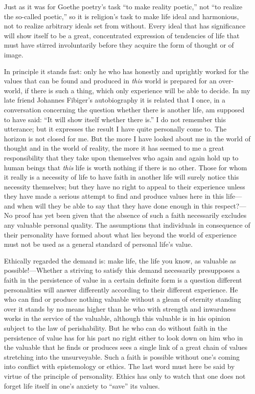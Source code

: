 \documentclass[12pt,a4paper]{book}
\newcommand{\opage}[1]{\marginnote{\footnotesize\textit{[#1]}}}
\begin{document}
Just as it was for Goethe poetry's task ``to make reality poetic,'' not ``to realize the so-called poetic,'' so
it is religion's task to make life ideal and harmonious, not to realize arbitrary ideals set from without. Every
ideal that has significance will show itself to be a great, concentrated expression of tendencies of life that
must have stirred involuntarily before they acquire the form of thought or of image.

In principle it stands fast: only he who has honestly and uprightly worked for the values that can be found and
produced in \emph{this} world is prepared for an over-world, if there is such a thing, which only experience
will be able to decide. In my late friend Johannes Fibiger's autobiography it is related that I once, in a
conversation concerning the question whether there is another life, am supposed to have said: ``It will show
itself whether there is.'' I do not remember this utterance; but it expresses the result I have quite personally
come to. The horizon is not closed for me. But the more I have looked about me in the world of thought and in
the world of reality, the more it has seemed to me a great responsibility that they take upon themselves who
again and again hold up to human beings that \emph{this} 
\opage{243}life is worth nothing if there is no other. Those for
whom it really is a necessity of life to have faith in another life will surely notice this necessity
themselves; but they have no right to appeal to their experience unless they have made a serious attempt to find
and produce values here in this life---and when will they be able to say that they have done enough in this
respect?---No proof has yet been given that the absence of such a faith necessarily excludes any valuable
personal quality. The assumptions that individuals in consequence of their personality have formed about what
lies beyond the world of experience must not be used as a general standard of personal life's value.

Ethically regarded the demand is: make life, the life you know, as valuable as possible!---Whether a striving to
satisfy this demand necessarily presupposes a faith in the persistence of value in a certain definite form is a
question different personalities will answer differently according to their different experience. He who can
find or produce nothing valuable without a gleam of eternity standing over it stands by no means higher than he
who with strength and inwardness works in the service of the valuable, although this valuable is in his opinion
subject to the law of perishability. But he who can do without faith in the persistence of value has for his
part no right either to look down on him who in the valuable that he finds or produces sees a single link of a
great chain of values stretching into the unsurveyable. Such a faith is possible without one's coming into
conflict with epistemology or ethics. The last word must here be said by virtue of the principle of personality.
Ethics has only to watch that one does not forget life itself in one's anxiety to ``save'' its values.
\end{document}
